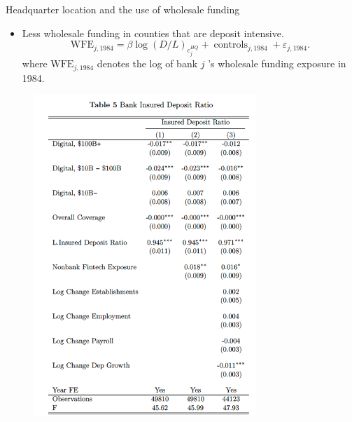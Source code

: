 \documentclass[notes,10pt, aspectratio=169]{beamer}
\begin{document}
    
            \begin{frame}{Headquarter location and the use of wholesale funding         \hyperlink{mismatch_sorting}{}}\label{mismatch_sorting2}
        \begin{itemize}
            \item Less wholesale funding in counties that are deposit intensive.
            $$
            \mathrm{WFE}_{j, 1984}=\beta \log (D / L)_{c_j^{H Q}}+\operatorname{controls}_{j, 1984}+\varepsilon_{j, 1984} .
            $$
            where $\mathrm{WFE}_{j, 1984}$ denotes the log of bank $j$ 's wholesale funding exposure in 1984. %
        \end{itemize}
    
        
        \begin{figure}
            \centering
            \includegraphics[width=0.75\textwidth]{imgs/tab5.png}
            \label{fig:my_label}
        \end{figure}
        
        \end{frame}
    
\end{document}
